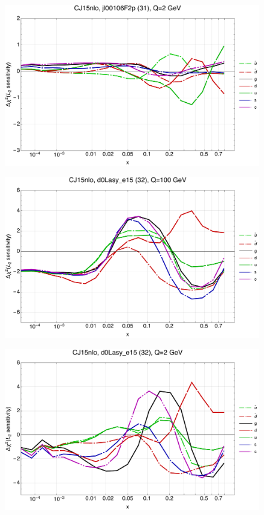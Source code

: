 \documentclass[10pt,aps,prd,floatfix,titlepage]{revtex4}
\begin{document}
\begin{figure}
\includegraphics[width=\textwidth,height=0.44\textheight,keepaspectratio]{1/31_CJ15nlo_L2_q2_Sf_1.pdf}
\caption{}
\end{figure}
\clearpage
\begin{figure}
\includegraphics[width=\textwidth,height=0.44\textheight,keepaspectratio]{1/32_CJ15nlo_L2_q100_Sf_1.pdf}
\caption{}
\end{figure}
\begin{figure}
\includegraphics[width=\textwidth,height=0.44\textheight,keepaspectratio]{1/32_CJ15nlo_L2_q2_Sf_1.pdf}
\caption{}
\end{figure}
\end{document}
